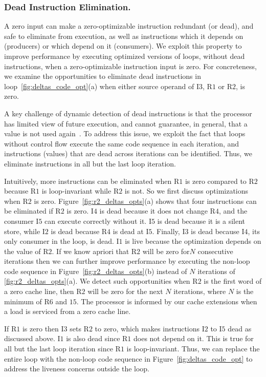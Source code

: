 \subsubsection{Dead Instruction Elimination.} A zero input can make a zero-optimizable instruction redundant (or dead), and safe to eliminate from execution, as well as instructions which it depends on (producers) or which depend on it (consumers).  We exploit this property to improve performance by executing optimized versions of loops, without dead instructions, when a zero-optimizable instruction input is zero.  For concreteness, we examine the opportunities to eliminate dead instructions in loop~\ref{fig:deltas_code_opt}(a) when either source operand of I$3$, R$1$ or R$2$, is zero.  

A key challenge of dynamic detection of dead instructions is that the processor has limited view of future execution, and cannot guarantee, in general, that a value is not used again~\cite{Butts02}.  To address this issue, we exploit the fact that loops without control flow execute the same code sequence in each iteration, and instructions (values) that are dead across iterations can be identified. Thus, we eliminate instructions in all but the last loop iteration. 

Intuitively, more instructions can be eliminated when R$1$ is zero compared to R$2$ because R$1$ is loop-invariant while R$2$ is not.  So we first discuss optimizations when R$2$ is zero.  Figure~\ref{fig:r2_deltas_opts}(a) shows that four instructions can be eliminated if R$2$ is zero.  I$4$ is dead because it does not change R$4$, and the consumer I$5$ can execute correctly without it.  I$5$ is dead because it is a silent store, while I$2$ is dead because R$4$ is dead at I$5$.  Finally, I$3$ is dead because I$4$,  its only consumer in the loop,  is dead.  I$1$ is live because the optimization depends on the value of R$2$.  If we know apriori that R$2$ will be zero for$N$ consecutive iterations then we can further improve performance by executing the non-loop code sequence in Figure~\ref{fig:r2_deltas_opts}(b)  instead of $N$ iterations of \ref{fig:r2_deltas_opts}(a).   We detect such opportunities when R$2$ is the first word of a zero cache line, then R$2$ will be zero for the next $N$ iterations, where $N$ is the minimum of R$6$ and $15$.  The processor is informed by our cache extensions when a load is serviced from a zero cache line.

If R$1$ is zero then I$3$ sets R$2$ to zero, which makes instructions I$2$ to I$5$ dead as discussed above.  I$1$ is also dead since R$1$ does not depend on it.  This is true for all but the last loop iteration since R$1$ is loop-invariant.  Thus, we can replace the entire loop with the non-loop code sequence in Figure~\ref{fig:deltas_code_opt} to address the liveness concerns outside the loop.  

